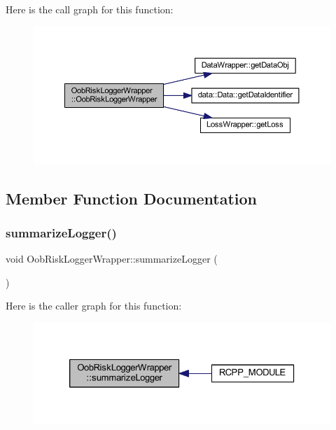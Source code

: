 Here is the call graph for this function\+:\nopagebreak
\begin{figure}[H]
\begin{center}
\leavevmode
\includegraphics[width=350pt]{class_oob_risk_logger_wrapper_a5d5aabfad52c12922c892a3ddf29c2d4_cgraph}
\end{center}
\end{figure}


\subsection{Member Function Documentation}
\mbox{\label{class_oob_risk_logger_wrapper_a9fa91f33c8b15c466ee95d764ad47ecd}} 
\subsubsection{\texorpdfstring{summarize\+Logger()}{summarizeLogger()}}
{\footnotesize\ttfamily void Oob\+Risk\+Logger\+Wrapper\+::summarize\+Logger (\begin{DoxyParamCaption}{ }\end{DoxyParamCaption})\hspace{0.3cm}{\ttfamily [inline]}}

Here is the caller graph for this function\+:\nopagebreak
\begin{figure}[H]
\begin{center}
\leavevmode
\includegraphics[width=326pt]{class_oob_risk_logger_wrapper_a9fa91f33c8b15c466ee95d764ad47ecd_icgraph}
\end{center}
\end{figure}


